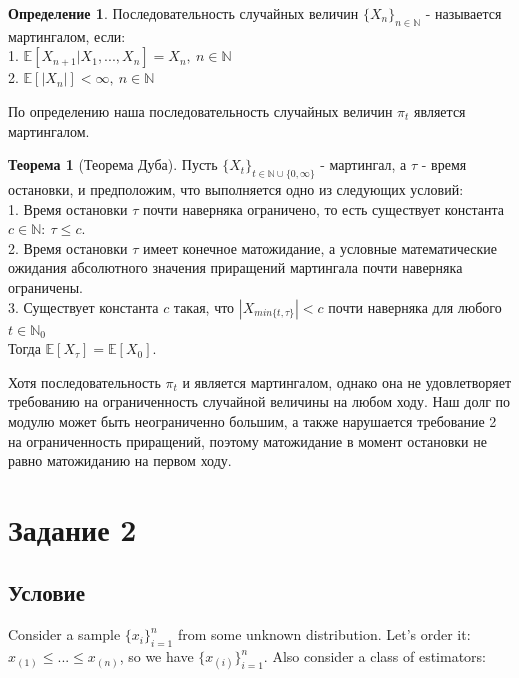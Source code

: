 \documentclass[a4paper]{article}
\theoremstyle{definition}
\newtheorem{definition}{Определение}[section]
\newtheorem{theorem}{Теорема}[section]
\begin{document}
    \begin{definition}
        Последовательность случайных величин $\{X_n\}_{n \in \mathbb{N}}$ - называется мартингалом, если: \\
        1. $\mathbb{E}[X_{n+1}| X_1, ..., X_n] = X_n, \ n \in \mathbb{N}$ \\
        2. $\mathbb{E}[|X_n|] < \infty, \ n \in \mathbb{N}$
    \end{definition}

    По определению наша последовательность случайных величин $\pi_t$ является мартингалом.

    \begin{theorem}[Теорема Дуба]
        Пусть $\{X_t\}_{t \in \mathbb{N} \cup \{0, \infty\}}$ - мартингал, а $\tau$ - время остановки, и предположим, что выполняется одно из следующих условий: \\
        1. Время остановки $\tau$ почти наверняка ограничено, то есть существует константа $c \in \mathbb{N}: \ \tau \le c$. \\
        2. Время остановки $\tau$ имеет конечное матожидание, а условные математические ожидания абсолютного значения приращений мартингала почти наверняка ограничены. \\
        3. Существует константа $c$ такая, что $|X_{min\{t, \tau\}}| < c$ почти наверняка для любого $t \in \mathbb{N}_0$ \\

        Тогда $\mathbb{E}[X_\tau] = \mathbb{E}[X_0]$.
    \end{theorem}

    Хотя последовательность $\pi_t$ и является мартингалом, однако она не удовлетворяет требованию на ограниченность случайной величины на любом ходу.
    Наш долг по модулю может быть неограниченно большим, а также нарушается требование 2 на ограниченность приращений, поэтому матожидание в момент остановки не равно матожиданию на первом ходу.

\section{Задание 2}
\subsection{Условие}
    Consider a sample $\{x_i\}_{i=1}^n$ from some unknown distribution. Let’s order it: $x_{(1)} \le . . . \le x_{(n)}$, so we have $\{x_{(i)}\}_{i=1}^n$. 
Also consider a class of estimators: \\
\end{document}
